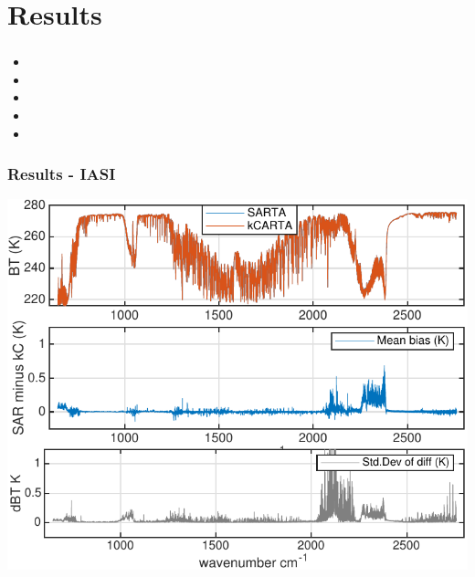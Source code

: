 \documentclass[10pt,t]{beamer}
\begin{document}
\section{Results}
\begin{frame}
  \frametitle{}
  \begin{itemize}
  \item 
  \item 
  \item 
  \item 
  \item 
    
  \end{itemize}
\end{frame}

\begin{frame}
  \frametitle{Results - IASI}
  \begin{center}
    \includegraphics[width=0.9\linewidth]{./Figs/Pdf/kc_sar_iasi_mean_bias_stdv_sea_6angs_aslp.pdf}
  \end{center}
      
 \end{frame}
\end{document}
